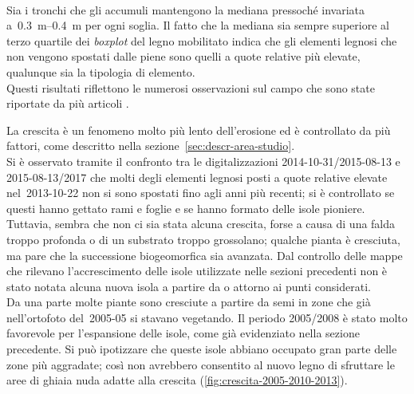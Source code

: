 \\
Sia i tronchi che gli accumuli mantengono la mediana pressoché invariata a~\SIrange[range-phrase = {-}, range-units = single]{0.3}{0.4}{\m} per ogni soglia.
Il fatto che la mediana sia sempre superiore al terzo quartile dei \emph{boxplot} del legno mobilitato indica che gli elementi legnosi che non vengono spostati dalle piene sono quelli a quote relative più elevate, qualunque sia la tipologia di elemento.
\\
Questi risultati riflettono le numerosi osservazioni sul campo che sono state riportate da più articoli .

La crescita è un fenomeno molto più lento dell'erosione ed è controllato da più fattori, come descritto nella sezione~\ref{sec:descr-area-studio}.
\\
Si è osservato tramite il confronto tra le digitalizzazioni 2014-10-31/2015-08-13 e 2015-08-13/2017 che molti degli elementi legnosi posti a quote relative elevate nel~2013-10-22 non si sono spostati fino agli anni più recenti; si è controllato se questi hanno gettato rami e foglie e se hanno formato delle isole pioniere.
Tuttavia, sembra che non ci sia stata alcuna crescita, forse a causa di una falda troppo profonda o di un substrato troppo grossolano; qualche pianta è cresciuta, ma pare che la successione biogeomorfica sia avanzata.
Dal controllo delle mappe che rilevano l'accrescimento delle isole utilizzate nelle sezioni precedenti non è stato notata alcuna nuova isola a partire da o attorno ai punti considerati.
\\
Da una parte molte piante sono cresciute a partire da semi in zone che già nell'ortofoto del~2005-05 si stavano vegetando. Il periodo 2005/2008 è stato molto favorevole per l'espansione delle isole, come già evidenziato nella sezione precedente.
Si può ipotizzare che queste isole abbiano occupato gran parte delle zone più aggradate; così non avrebbero consentito al nuovo legno di sfruttare le aree di ghiaia nuda adatte alla crescita (\cref{fig:crescita-2005-2010-2013}).
%
